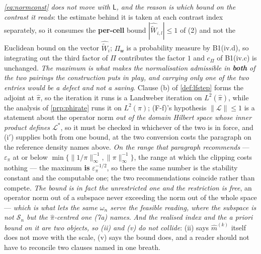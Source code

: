 \emph{\eqref{eq:normconst} does not move with $\mathsf L$, and the reason is which bound on the
contrast it reads}: the estimate behind it is taken at each contrast index separately, so it consumes
the \textbf{per-cell} bound $|\widehat{\widetilde W}_{i,l}|\le1$ of
\textup{(2)} and not the Euclidean bound on the vector
$\widehat{\widetilde W}_i$; $\Pi_{\mathsf w}$ is a probability measure by B1(iv.d), so integrating out
the third factor of $\Pi$ contributes the factor $1$ and $c_\Pi$ of B1(iv.c) is unchanged.
\emph{The maximum is what makes the normalisation admissible in \textbf{both} of the two pairings the
construction puts in play, and carrying only one of the two entries would be a defect and not a
saving}. Clause \textup{(b)} of \cref{def:lfstep} forms the adjoint at $\hat\pi$, so the iteration it
runs is a Landweber iteration on $L^{2}(\hat\pi)$, while the analysis of \cref{prp:phirate} runs it on
$L^{2}(\pi)$; \textup{(F-f)}'s hypothesis $\|\mathcal L\|\le1$ is a statement about the operator norm
\emph{out of the domain Hilbert space whose inner product defines $\mathcal L^{\ast}$}, so it must be
checked in whichever of the two is in force, and \textup{(i$'$)}
supplies both from one bound, at the two conversion costs the paragraph on the reference density
names above. \emph{On the range that paragraph recommends} --- $\varepsilon_\pi$ at or below
$\min\{\|1/\pi\|_\infty^{-1},\|\pi\|_\infty^{-1}\}$, the range at which the clipping costs nothing ---
the maximum \textbf{is} $\varepsilon_\pi^{-1/2}$, so there the same number is the stability constant
and the computable one; the two recommendations coincide rather than compete.
\emph{The bound is in fact the unrestricted one and the restriction is free}, an operator norm out of a
subspace never exceeding the norm out of the whole space --- \emph{which is what lets the same
$\omega_n$ serve the feasible reading, where the subspace is not $\mathcal S_n$ but the
$\hat\pi$-centred one \textup{(7a)} names}. \emph{And the realised index and
the \emph{a priori} bound on it are two objects, so (ii) and (v) do not
collide}: (ii) says $\hat m^{(k)}$ itself does not move with the scale, (v) says the bound does, and a
reader should not have to reconcile two clauses named in one breath.

